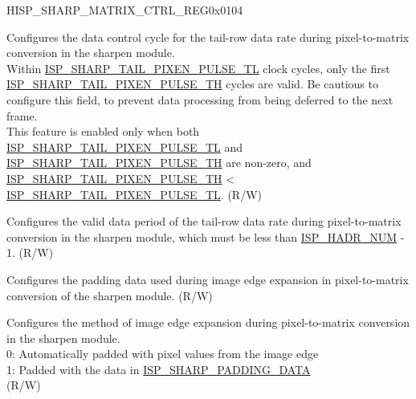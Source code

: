 \begin{register}{H}{ISP\_SHARP\_MATRIX\_CTRL\_REG}{0x0104}\label{regdesc:ISPSHARPMATRIXCTRLREG}
%
%
%
%
%
\regnewline%
\begin{regdesc}\begin{reglist}
\label{fielddesc:ISPSHARPTAILPIXENPULSETL}\item [ISP\_SHARP\_TAIL\_PIXEN\_PULSE\_TL] Configures the data control cycle for the tail-row data rate during pixel-to-matrix conversion in the sharpen module.\\Within \hyperref[fielddesc:ISPSHARPTAILPIXENPULSETL]{ISP\_SHARP\_TAIL\_PIXEN\_PULSE\_TL} clock cycles, only the first \hyperref[fielddesc:ISPSHARPTAILPIXENPULSETH]{ISP\_SHARP\_TAIL\_PIXEN\_PULSE\_TH} cycles are valid. Be cautious to configure this field, to prevent data processing from being deferred to the next frame.\\This feature is enabled only when both \hyperref[fielddesc:ISPSHARPTAILPIXENPULSETL]{ISP\_SHARP\_TAIL\_PIXEN\_PULSE\_TL} and \hyperref[fielddesc:ISPSHARPTAILPIXENPULSETH]{ISP\_SHARP\_TAIL\_PIXEN\_PULSE\_TH} are non-zero, and \hyperref[fielddesc:ISPSHARPTAILPIXENPULSETH]{ISP\_SHARP\_TAIL\_PIXEN\_PULSE\_TH} < \hyperref[fielddesc:ISPSHARPTAILPIXENPULSETL]{ISP\_SHARP\_TAIL\_PIXEN\_PULSE\_TL}. (R/W)
\label{fielddesc:ISPSHARPTAILPIXENPULSETH}\item [ISP\_SHARP\_TAIL\_PIXEN\_PULSE\_TH] Configures the valid data period of the tail-row data rate during pixel-to-matrix conversion in the sharpen module, which must be less than \hyperref[fielddesc:ISPHADRNUM]{ISP\_HADR\_NUM} - 1. (R/W)
\label{fielddesc:ISPSHARPPADDINGDATA}\item [ISP\_SHARP\_PADDING\_DATA] Configures the padding data used during image edge expansion in pixel-to-matrix conversion of the sharpen module. (R/W)
\label{fielddesc:ISPSHARPPADDINGMODE}\item [ISP\_SHARP\_PADDING\_MODE] Configures the method of image edge expansion during pixel-to-matrix conversion in the sharpen module.\\0: Automatically padded with pixel values from the image edge\\1: Padded with the data in \hyperref[fielddesc:ISPSHARPPADDINGDATA]{ISP\_SHARP\_PADDING\_DATA}\\(R/W)
\end{reglist}\end{regdesc}
\end{register}


